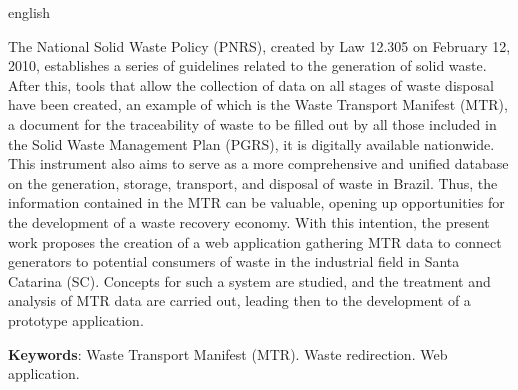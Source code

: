 \begin{resumo}[Abstract]
	\SingleSpacing
	\begin{otherlanguage*}{english}

		The National Solid Waste Policy (PNRS), created by Law 12.305 on February 12, 2010, establishes a series of guidelines related to the generation of solid waste. After this, tools that allow the collection of data on all stages of waste disposal have been created, an example of which is the Waste Transport Manifest (MTR), a document for the traceability of waste to be filled out by all those included in the Solid Waste Management Plan (PGRS), it is digitally available nationwide. This instrument also aims to serve as a more comprehensive and unified database on the generation, storage, transport, and disposal of waste in Brazil. Thus, the information contained in the MTR can be valuable, opening up opportunities for the development of a waste recovery economy. With this intention, the present work proposes the creation of a web application gathering MTR data to connect generators to potential consumers of waste in the industrial field in Santa Catarina (SC). Concepts for such a system are studied, and the treatment and analysis of MTR data are carried out, leading then to the development of a prototype application.
		
		\textbf{Keywords}: Waste Transport Manifest (MTR). Waste redirection. Web application.
	\end{otherlanguage*}
\end{resumo}

% 
%
%  

